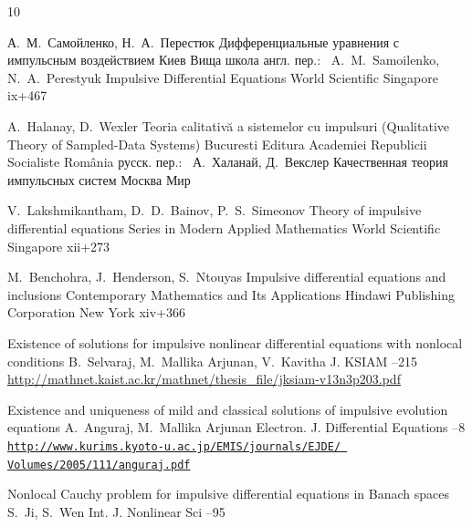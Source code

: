 \begin{thebibliography}{10}

\by А.~М.~Самойленко, Н.~А.~Перестюк
\book Дифференциальные уравнения с импульсным воздействием
\publaddr Киев
\publ Вища школа
\transl англ. пер.:~
\by A.~M.~Samoilenko, N.~A.~Perestyuk
\book Impulsive Differential Equations
\publ World Scientific
\publaddr Singapore 
\totalpages ix+467





\by A.~Halanay,  D.~Wexler
\book Teoria calitativ\u{a} a sistemelor cu impulsuri (Qualitative Theory of Sampled-Data Systems) \publaddr Bucuresti
\publ Editura Academiei Republicii Socialiste Rom\^{a}nia
\rtransl
русск. пер.:~
\by А.~Халанай, Д.~Векслер 
\book Качественная теория импульсных систем
\publaddr Москва
\publ Мир



\by V.~Lakshmikantham, D.~D.~Bainov,  P.~S.~Simeonov
\book Theory of impulsive differential equations
\serial Series in Modern Applied Mathematics
\publaddr World Scientific
\publ Singapore
\totalpages xii+273


\by  M.~Benchohra, J.~Henderson, S.~Ntouyas 
\book Impulsive differential equations and inclusions
\serial Contemporary Mathematics and Its Applications
\publaddr Hindawi Publishing Corporation
\publ New York
\totalpages xiv+366

\paper Existence of solutions for impulsive nonlinear differential equations with nonlocal conditions
\by B.~Selvaraj, M.~Mallika Arjunan, V.~Kavitha 
\jour J. KSIAM
--215
\elink \url{http://mathnet.kaist.ac.kr/mathnet/thesis_file/jksiam-v13n3p203.pdf}

\paper Existence and uniqueness of mild and classical solu\-tions of impulsive evolution equations
\by A.~Anguraj,  M.~Mallika Arjunan
\jour Electron. J. Differential Equations
--8
\elink \href{http://www.kurims.kyoto-u.ac.jp/EMIS/journals/EJDE/Volumes/2005/111/anguraj.pdf}{\tt http://www.kurims.kyoto-u.ac.jp/EMIS/journals/EJDE/ Volumes/2005/111/anguraj.pdf}

\paper Nonlocal Cauchy problem for impulsive differential equations in Banach spaces
\by  S.~Ji,  S.~Wen 
\jour Int. J. Nonlinear Sci
--95



\end{thebibliography}
